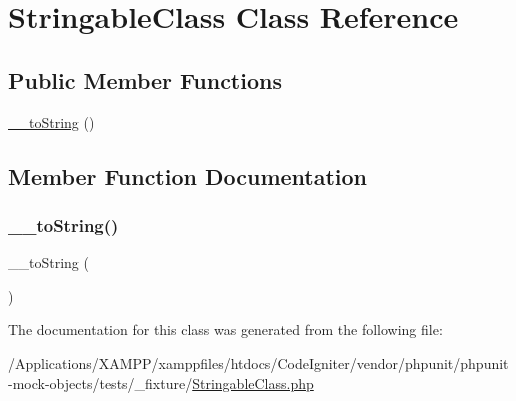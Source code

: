 \hypertarget{class_stringable_class}{}\section{Stringable\+Class Class Reference}
\label{class_stringable_class}
\subsection*{Public Member Functions}
\begin{DoxyCompactItemize}
\item 
\mbox{\hyperlink{class_stringable_class_a7516ca30af0db3cdbf9a7739b48ce91d}{\+\_\+\+\_\+to\+String}} ()
\end{DoxyCompactItemize}


\subsection{Member Function Documentation}
\mbox{\label{class_stringable_class_a7516ca30af0db3cdbf9a7739b48ce91d}} 
\subsubsection{\texorpdfstring{\+\_\+\+\_\+to\+String()}{\_\_toString()}}
{\footnotesize\ttfamily \+\_\+\+\_\+to\+String (\begin{DoxyParamCaption}{ }\end{DoxyParamCaption})}



The documentation for this class was generated from the following file\+:\begin{DoxyCompactItemize}
\item 
/\+Applications/\+X\+A\+M\+P\+P/xamppfiles/htdocs/\+Code\+Igniter/vendor/phpunit/phpunit-\/mock-\/objects/tests/\+\_\+fixture/\mbox{\hyperlink{_stringable_class_8php}{Stringable\+Class.\+php}}\end{DoxyCompactItemize}
